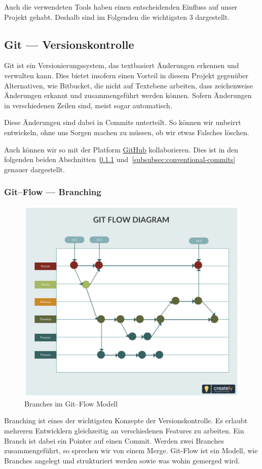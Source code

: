 Auch die verwendeten Tools haben einen entscheidenden Einfluss auf unser Projekt gehabt.
Deshalb sind im Folgenden die wichtigsten 3 dargestellt.


\subsection{Git --- Versionskontrolle}\label{subsec:git-----versionskontrolle}
Git ist ein Versionierungssystem, das textbasiert Änderungen erkennen und verwalten kann.
Dies bietet insofern einen Vorteil in diesem Projekt gegenüber Alternativen, wie Bitbucket, die nicht auf Textebene arbeiten, dass zeichenweise Änderungen erkannt und zusammengeführt werden können.
Sofern Änderungen in verschiedenen Zeilen sind, meist sogar automatisch.


Diese Änderungen sind dabei in Commits unterteilt.
So können wir unbeirrt entwickeln, ohne uns Sorgen machen zu müssen, ob wir etwas Falsches löschen.


Auch können wir so mit der Platform \href{https://github.com/WHS-SLAB-WiSe22-23-P1/Labyrinth}{GitHub} kollaborieren.
Dies ist in den folgenden beiden Abschnitten~\ref{subsubsec:git--flow-----branching} und~\ref{subsubsec:conventional-commits} genauer dargestellt.

\subsubsection{Git--Flow --- Branching}\label{subsubsec:git--flow-----branching}
\begin{figure}
    \centering
    \includegraphics[width=\paperwidth-2in]{../assets/img/git_flow}
    \caption{Branches im Git--Flow Modell~\autocite{creately-no-date}}
    \label{fig:git-flow}
\end{figure}
Branching ist eines der wichtigsten Konzepte der Versionskontrolle.
Es erlaubt mehreren Entwicklern gleichzeitig an verschiedenen Features zu arbeiten.
Ein Branch ist dabei ein Pointer auf einen Commit.
Werden zwei Branches zusammengeführt, so sprechen wir von einem Merge.
Git-Flow ist ein Modell, wie Branches angelegt und strukturiert werden sowie was wohin gemerged wird.


